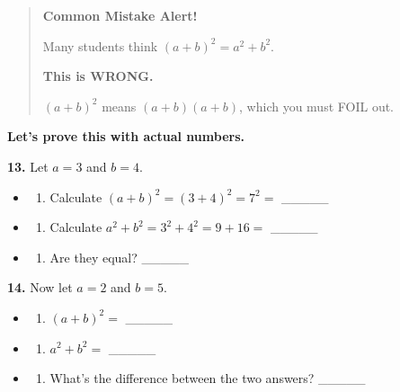 \documentclass[
  11pt,
]{article}
\providecommand{\tightlist}{%
  \setlength{\itemsep}{0pt}\setlength{\parskip}{0pt}}
\begin{document}
\begin{quote}
\textbf{Common Mistake Alert!}

Many students think \((a + b)^2 = a^2 + b^2\).

\textbf{This is WRONG.}

\((a + b)^2\) means \((a + b)(a + b)\), which you must FOIL out.
\end{quote}

\textbf{Let's prove this with actual numbers.}

\textbf{13.} Let \(a = 3\) and \(b = 4\).

\begin{itemize}
\item
  \begin{enumerate}
  \def\labelenumi{(\alph{enumi})}
  \tightlist
  \item
    Calculate \((a + b)^2 = (3 + 4)^2 = 7^2 ={}\) \_\_\_\_\_
  \end{enumerate}
\item
  \begin{enumerate}
  \def\labelenumi{(\alph{enumi})}
  \setcounter{enumi}{1}
  \tightlist
  \item
    Calculate \(a^2 + b^2 = 3^2 + 4^2 = 9 + 16 ={}\) \_\_\_\_\_
  \end{enumerate}
\item
  \begin{enumerate}
  \def\labelenumi{(\alph{enumi})}
  \setcounter{enumi}{2}
  \tightlist
  \item
    Are they equal? \_\_\_\_\_
  \end{enumerate}
\end{itemize}

\textbf{14.} Now let \(a = 2\) and \(b = 5\).

\begin{itemize}
\item
  \begin{enumerate}
  \def\labelenumi{(\alph{enumi})}
  \tightlist
  \item
    \((a + b)^2 ={}\) \_\_\_\_\_
  \end{enumerate}
\item
  \begin{enumerate}
  \def\labelenumi{(\alph{enumi})}
  \setcounter{enumi}{1}
  \tightlist
  \item
    \(a^2 + b^2 ={}\) \_\_\_\_\_
  \end{enumerate}
\item
  \begin{enumerate}
  \def\labelenumi{(\alph{enumi})}
  \setcounter{enumi}{2}
  \tightlist
  \item
    What's the difference between the two answers? \_\_\_\_\_
  \end{enumerate}
\end{itemize}
\end{document}
